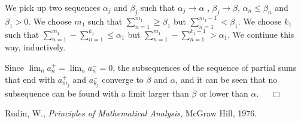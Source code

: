 \documentclass[12pt]{article}
\newcommand{\qed}{$\ \ \ \ \ \Box$}
\begin{document}
We pick up two sequences $\alpha_j$ and $\beta_j$ such that $\alpha_j\rightarrow \alpha $ , $\beta_j \rightarrow \beta$, $\alpha_n \leq \beta_n$ and  $\beta_1 >0$.  We choose $m_1$ such that $\sum_{n=1}^{m_1} \geq \beta_1$ but $\sum_{n=1}^{m_1-1} < \beta_1$. We choose $k_1$ such that $\sum_{n=1}^{m_1}  - \sum_{n=1}^{k_1}\leq \alpha_1$ but $\sum_{n=1}^{m_1}  - \sum_{n=1}^{k_1-1}>\alpha_1$.  We continue this way, inductively.


Since $\lim_n a_n^+ = \lim_n a_n^- = 0$, the subsequences of the sequence of partial sums that end with $a^+_{m_j}$ and $a^-_{k_j}$ converge to $\beta$ and $\alpha$, and it can be seen that no subsequence can be found with a limit larger than $\beta$ or lower than $\alpha$. \qed

\begin{thebibliography}{9}
Rudin, W., \textsl{Principles of Mathematical Analysis},  McGraw Hill, 1976.

\end{thebibliography}
\end{document}
